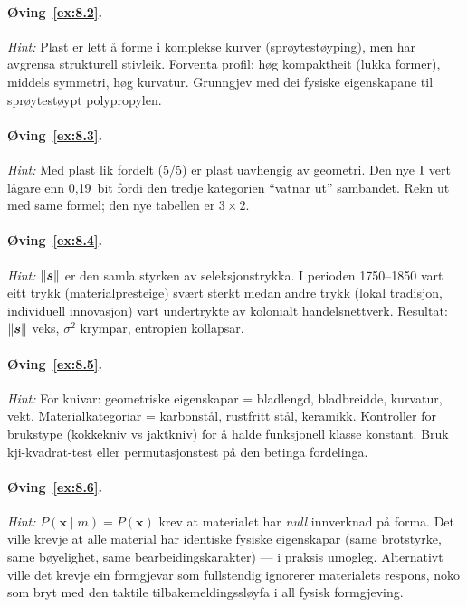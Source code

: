 \paragraph{Øving~\ref{ex:8.2}.}
\emph{Hint:} Plast er lett å forme i komplekse kurver
(sprøytestøyping), men har avgrensa strukturell stivleik. Forventa
profil: høg kompaktheit (lukka former), middels symmetri, høg
kurvatur. Grunngjev med dei fysiske eigenskapane til sprøytestøypt
polypropylen.

\paragraph{Øving~\ref{ex:8.3}.}
\emph{Hint:} Med plast lik fordelt (5/5) er plast uavhengig av
geometri. Den nye $\operatorname{I}$ vert lågare enn 0{,}19~bit fordi den
tredje kategorien ``vatnar ut'' sambandet. Rekn ut med same
formel; den nye tabellen er $3 \times 2$.

\paragraph{Øving~\ref{ex:8.4}.}
\emph{Hint:} $\lVert \bm{s} \rVert$ er den samla styrken av
seleksjonstrykka. I perioden 1750--1850 vart eitt trykk
(materialpresteige) svært sterkt medan andre trykk (lokal
tradisjon, individuell innovasjon) vart undertrykte av kolonialt
handelsnettverk. Resultat: $\lVert \bm{s} \rVert$ veks,
$\sigma^2$ krympar, entropien kollapsar.

\paragraph{Øving~\ref{ex:8.5}.}
\emph{Hint:} For knivar: geometriske eigenskapar = bladlengd,
bladbreidde, kurvatur, vekt. Materialkategoriar = karbonstål,
rustfritt stål, keramikk. Kontroller for brukstype (kokkekniv vs
jaktkniv) for å halde funksjonell klasse konstant.
Bruk kji-kvadrat-test eller permutasjonstest på den betinga
fordelinga.

\paragraph{Øving~\ref{ex:8.6}.}
\emph{Hint:} $P(\bm{x} \mid m) = P(\bm{x})$ krev at materialet
har \emph{null} innverknad på forma. Det ville krevje at alle
material har identiske fysiske eigenskapar (same brotstyrke, same
bøyelighet, same bearbeidingskarakter) --- i praksis umogleg.
Alternativt ville det krevje ein formgjevar som fullstendig
ignorerer materialets respons, noko som bryt med den taktile
tilbakemeldingssløyfa i all fysisk formgjeving.


